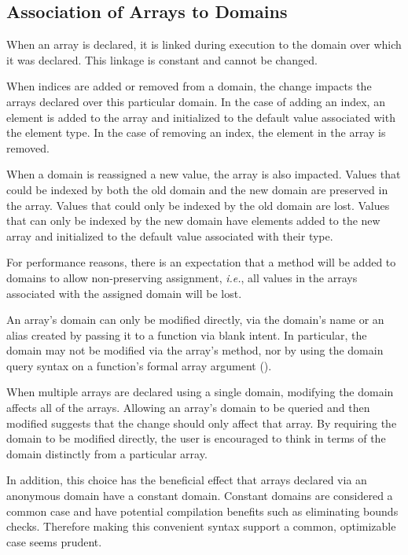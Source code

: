 \subsection{Association of Arrays to Domains}
\label{Association_of_Arrays_to_Domains}

When an array is declared, it is linked during execution to the domain
over which it was declared.  This linkage is constant and cannot be
changed.

When indices are added or removed from a domain, the change impacts
the arrays declared over this particular domain.  In the case of
adding an index, an element is added to the array and initialized to
the default value associated with the element type.  In the case of
removing an index, the element in the array is removed.

When a domain is reassigned a new value, the array is also impacted.
Values that could be indexed by both the old domain and the new domain
are preserved in the array.  Values that could only be indexed by the
old domain are lost.  Values that can only be indexed by the new
domain have elements added to the new array and initialized to the
default value associated with their type.

For performance reasons, there is an expectation that a method will be
added to domains to allow non-preserving assignment, \emph{i.e.}, all
values in the arrays associated with the assigned domain will be lost.

An array's domain can only be modified directly, via the domain's name
or an alias created by passing it to a function via blank intent.  In
particular, the domain may not be modified via the array's
 method, nor by using the domain query syntax on a
function's formal array argument
().

\begin{rationale}
When multiple arrays are declared using a single domain, modifying the
domain affects all of the arrays.  Allowing an array's domain to be
queried and then modified suggests that the change should only affect
that array.  By requiring the domain to be modified directly, the user
is encouraged to think in terms of the domain distinctly from a
particular array.

In addition, this choice has the beneficial effect that arrays
declared via an anonymous domain have a constant domain.  Constant
domains are considered a common case and have potential compilation
benefits such as eliminating bounds checks.  Therefore making this
convenient syntax support a common, optimizable case seems prudent.
\end{rationale}

